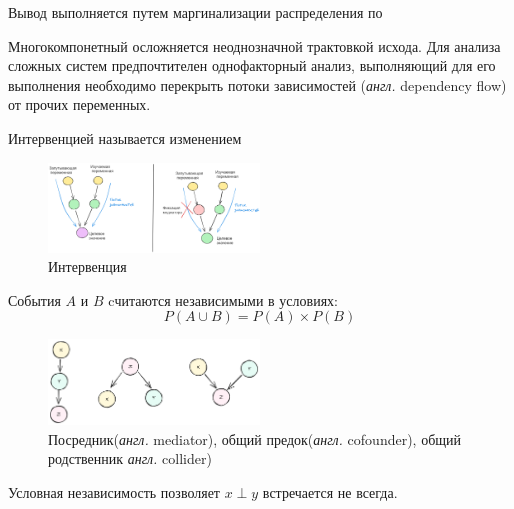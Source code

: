 Вывод выполняется путем маргинализации распределения по 



Многокомпонетный осложняется неоднозначной трактовкой исхода. 
Для анализа сложных систем предпочтителен однофакторный анализ, выполняющий
для его выполнения необходимо перекрыть потоки зависимостей (\textit{англ.} dependency flow) от
прочих переменных.

 Интервенцией называется изменением 

\begin{figure}[h]
    \centering
    \includegraphics[width=0.5\textwidth]{assets/math/discrete/dep_flow.excalidraw.png}
    \caption{Интервенция}
    \label{discr_vs_gen}
\end{figure}





 События $A$ и $B$ cчитаются независимыми в условиях:
\begin{equation}
    P(A \cup B) = P(A) \times P(B)
\end{equation}





\begin{figure}[h]
    \centering
    \includegraphics[width=0.5\textwidth]{assets/math/discrete/bayes_net.excalidraw.png}
    \caption{Посредник(\textit{англ.} mediator), общий предок(\textit{англ.} cofounder), 
 общий родственник \textit{англ.} collider) }
    \label{discr_vs_gen}
\end{figure}




Условная независимость позволяет 
$x \perp y$ встречается не всегда.


